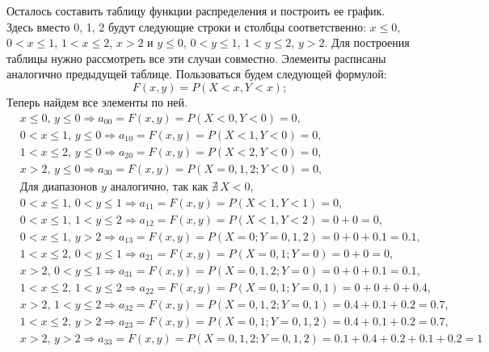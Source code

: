\documentclass[a4paper, 12pt]{article}
\begin{document}
    Осталось составить таблицу функции распределения и построить ее график. Здесь вместо 0, 1, 2 будут
    следующие строки и столбцы соответственно: $x\leq 0$, $0<x\leq1$, $1<x\leq2$, $x>2$ и $y\leq 0$, $0<y\leq1$, $1<y\leq2$, $y>2$.
    Для построения таблицы нужно рассмотреть все эти случаи совместно. Элементы расписаны аналогично предыдущей таблице.
    Пользоваться будем следующей формулой: $$F(x,y)=P(X<x,Y<x);$$
    Теперь найдем все элементы по ней.
    \begin{align*}
        & x\leq 0,\,y\leq0\Rightarrow a_{00}=F(x,y)=P(X<0,Y<0)=0,\\
        & 0<x\leq 1,\,y\leq0\Rightarrow a_{10}=F(x,y)=P(X<1,Y<0)=0,\\
        & 1<x\leq 2,\,y\leq0\Rightarrow a_{20}=F(x,y)=P(X<2,Y<0)=0,\\
        & x>2,\,y\leq0\Rightarrow a_{30}=F(x,y)=P(X=0,1,2;Y<0)=0,\\
        & \text{Для диапазонов } y \text{ аналогично, так как } \nexists\,X<0,\\
        & 0<x\leq1,\,0<y\leq1\Rightarrow a_{11}=F(x,y)=P(X<1,Y<1)=0,\\
        & 0<x\leq1,\,1<y\leq2\Rightarrow a_{12}=F(x,y)=P(X<1,Y<2)=0+0=0,\\
        & 0<x\leq1,\,y>2\Rightarrow a_{13}=F(x,y)=P(X=0;Y=0,1,2)=0+0+0.1=0.1,\\
        & 1<x\leq2,\,0<y\leq1\Rightarrow a_{21}=F(x,y)=P(X=0,1;Y=0)=0+0=0,\\
        & x>2,\,0<y\leq1\Rightarrow a_{31}=F(x,y)=P(X=0,1,2;Y=0)=0+0+0.1=0.1,\\
        & 1<x\leq2,\,1<y\leq2\Rightarrow a_{22}=F(x,y)=P(X=0,1;Y=0,1)=0+0+0+0.4,\\
        & x>2,\,1<y\leq2\Rightarrow a_{32}=F(x,y)=P(X=0,1,2;Y=0,1)=0.4+0.1+0.2=0.7,\\
        & 1<x\leq2,\,y>2\Rightarrow a_{23}=F(x,y)=P(X=0,1;Y=0,1,2)=0.4+0.1+0.2=0.7,\\
        & x>2,\,y>2\Rightarrow a_{33}=F(x,y)=P(X=0,1,2;Y=0,1,2)=0.1+0.4+0.2+0.1+0.2=1
    \end{align*}
\end{document}
